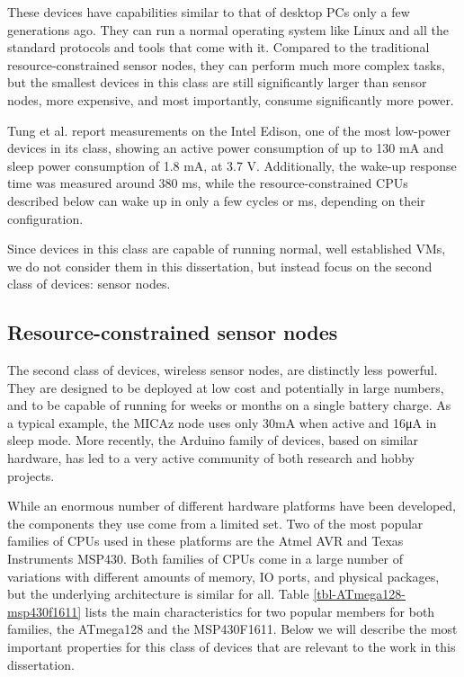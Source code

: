 These devices have capabilities similar to that of desktop PCs only a few generations ago. They can run a normal operating system like Linux and all the standard protocols and tools that come with it. Compared to the traditional resource-constrained sensor nodes, they can perform much more complex tasks, but the smallest devices in this class are still significantly larger than sensor nodes, more expensive, and most importantly, consume significantly more power.

Tung et al. \cite{Tung:2017tn} report measurements on the Intel Edison, one of the most low-power devices in its class, showing an active power consumption of up to 130 mA and sleep power consumption of 1.8 mA, at 3.7 V. Additionally, the wake-up response time was measured around 380 ms, while the resource-constrained CPUs described below can wake up in only a few cycles or ms, depending on their configuration.

Since devices in this class are capable of running normal, well established VMs, we do not consider them in this dissertation, but instead focus on the second class of devices: sensor nodes.

\subsection{Resource-constrained sensor nodes}
The second class of devices, wireless sensor nodes, are distinctly less powerful. They are designed to be deployed at low cost and potentially in large numbers, and to be capable of running for weeks or months on a single battery charge. As a typical example, the MICAz node \cite{CrossbowTechnology} uses only 30mA when active and 16μA in sleep mode. More recently, the Arduino family of devices, based on similar hardware, has led to a very active community of both research and hobby projects.

While an enormous number of different hardware platforms have been developed, the components they use come from a limited set. Two of the most popular families of CPUs used in these platforms are the Atmel AVR and Texas Instruments MSP430. Both families of CPUs come in a large number of variations with different amounts of memory, IO ports, and physical packages, but the underlying architecture is similar for all. Table \ref{tbl-ATmega128-msp430f1611} lists the main characteristics for two popular members for both families, the ATmega128 and the MSP430F1611. Below we will describe the most important properties for this class of devices that are relevant to the work in this dissertation.


